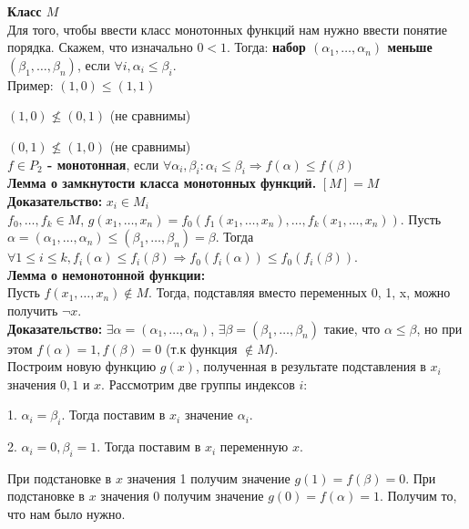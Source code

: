 \textbf{Класс $M$}\\

Для того, чтобы ввести класс монотонных функций нам нужно ввести понятие порядка. Скажем, что изначально $0 < 1$. Тогда:
\textbf{набор $(\alpha_1, \ldots, \alpha_n)$ меньше $(\beta_1, \ldots, \beta_n)$}, если $\forall i, \alpha_i \le \beta_i$.\\

Пример: $(1, 0) \le (1, 1)$

$(1, 0) \nleq (0, 1)$ (не сравнимы)

$(0, 1) \nleq (1, 0)$ (не сравнимы)\\

\textbf{$f \in P_2$ - монотонная}, если $\forall \alpha_i, \beta_i : \alpha_i \le \beta_i \Rightarrow f(\alpha) \le f(\beta)$\\

\textbf{Лемма о замкнутости класса монотонных функций.} $[M] = M$\\

\noindent \textbf{Доказательство:} $x_i \in M_i$\\

$f_0, \ldots, f_k \in M$, $g(x_1, \ldots, x_n) = f_0(f_1(x_1, \ldots, x_n), \ldots, f_k(x_1, \ldots, x_n))$.
Пусть $\alpha = (\alpha_1, \ldots, \alpha_n) \le (\beta_1, \ldots, \beta_n) = \beta$. Тогда $\forall 1 \le i \le k, f_i(\alpha) \le f_i(\beta) \Rightarrow f_0 ( f_i(\alpha) ) \le f_0 ( f_i (\beta) )$.\\

\textbf{Лемма о немонотонной функции:}\\

Пусть $f (x_1, \ldots, x_n) \notin M$. Тогда, подставляя вместо переменных 0, 1, x, можно получить $\neg x$.\\

\noindent \textbf{Доказательство:} $\exists \alpha = (\alpha_1, \ldots, \alpha_n)$, $\exists \beta = (\beta_1, \ldots, \beta_n)$ такие, что $\alpha \le \beta$, но при этом $f(\alpha) = 1, f(\beta) = 0$ (т.к функция $\notin M$). \\

Построим новую функцию $g(x)$, полученная в результате подставления в $x_i$ значения $0, 1$ и $x$. Рассмотрим две группы индексов $i$: 

\hspace{0.5cm}\parbox{12cm} {

1. $\alpha_i = \beta_i$. Тогда поставим в $x_i$ значение $\alpha_i$.

2. $\alpha_i = 0, \beta_i = 1$. Тогда поставим в $x_i$ переменную $x$.
}

При подстановке в $x$ значения 1 получим значение $g(1) = f(\beta) = 0$. При подстановке в $x$ значения 0 получим значение $g(0) = f(\alpha) = 1$. Получим то, что нам было нужно.
